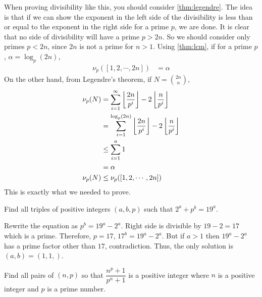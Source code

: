 \begin{solution}
	When proving divisibility like this, you should consider \autoref{thm:legendre}. The idea is that if we can show the exponent in the left side of the divisibility is less than or equal to the exponent in the right side for a prime $p$, we are done. It is clear that no side of divisibility will have a prime $p>2n$. So we should consider only primes $p<2n$, since $2n$ is not a prime for $n>1$. Using \autoref{thm:lcm}, if for a prime $p$, $\alpha =\log_p(2n)$,
		\begin{align*}
			\nu_p([1,2,\cdots,2n]) & = \alpha
		\end{align*}
	On the other hand, from Legendre's theorem, if $N=\binom{2n}n$,
		\begin{align*}
			\nu_p(N) & = \sum_{i=1}^{\infty}\left\lfloor{\dfrac{2n}{p^i}}\right\rfloor-2\left\lfloor{\dfrac{n}{p^i}}\right\rfloor\\
				 & = \sum_{i=1}^{\log_{p}(2n)}\left\lfloor{\dfrac{2n}{p^i}}\right\rfloor-2\left\lfloor{\dfrac{n}{p^i}}\right\rfloor\\
				 &\leq\sum_{i=1}^{a}1\\
				 & = \alpha \\
			\nu_p(N) &\leq\nu_p([1,2,\cdots,2n])
		\end{align*}
	This is exactly what we needed to prove.
\end{solution}

\begin{problem}
	Find all triples of positive integers $(a, b, p)$ such that $2^a+p^b=19^a$.
\end{problem}

\begin{solution}
	Rewrite the equation as $p^b=19^a-2^a$. Right side is divisible by $19-2=17$ which is a prime. Therefore, $p=17$, $17^b=19^a-2^a$. But if $a>1$ then $19^a-2^a$ has a prime factor other than $17$, contradiction. Thus, the only solution is $(a,b)=(1,1,)$.
\end{solution}


\begin{problem}
	Find all pairs of $(n, p)$ so that $\dfrac{n^p+1}{p^n+1}$ is a positive integer where $n$ is a positive integer and $p$ is a prime number.
\end{problem}

